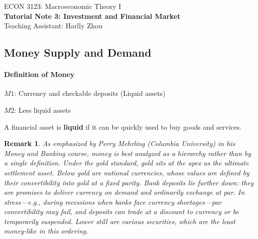 \documentclass[12pt]{article}
\newtheorem*{remark}{Remark}
\begin{document}
\begin{center}
    ECON 3123: Macroeconomic Theory I\\
    {\large \textbf{Tutorial Note 3: Investment and Financial Market}}\\
    Teaching Assistant: Harlly Zhou
\end{center}

\subsection*{Money Supply and Demand}
\paragraph{Definition of Money}
$M1$: Currency and checkable deposits (Liquid assets)

$M2$: Less liquid assets

A financial asset is \textbf{liquid} if it can be quickly used to buy goods and services.

\begin{remark}
	As emphasized by Perry Mehrling (Columbia University) in his Money and Banking course, money is best analyzed as a \emph{hierarchy} rather than by a single definition. Under the gold standard, gold sits at the apex as the ultimate settlement asset. Below gold are national currencies, whose values are defined by their convertibility into gold at a fixed parity. Bank deposits lie further down: they are promises to deliver currency on demand and ordinarily exchange at par. In stress—e.g., during recessions when banks face currency shortages—par convertibility may fail, and deposits can trade at a discount to currency or be temporarily suspended. Lower still are various securities, which are the least money-like in this ordering.
\end{remark}
\end{document}
